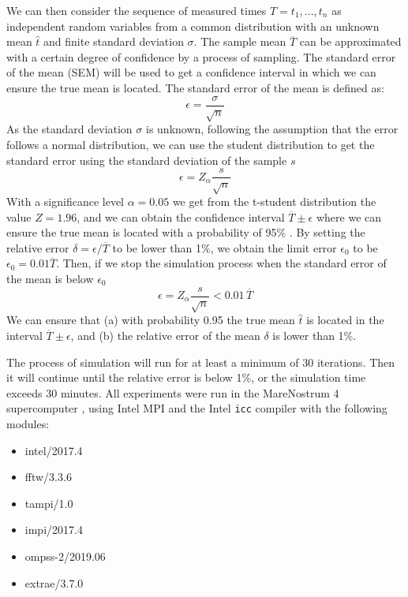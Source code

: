 We can then consider the sequence of measured times $T = t_1,\ldots,t_n$ as 
independent random variables from a common distribution with an unknown mean 
$\hat t$ and finite standard deviation $\sigma$. The sample mean $\overline T$ 
can be approximated with a certain degree of confidence by a process of 
sampling. The standard error of the mean (SEM) will be used to get a confidence 
interval in which we can ensure the true mean is located. The standard error of 
the mean is defined as:
%
\begin{equation}
\epsilon = \frac{\sigma}{\sqrt{n}}
\end{equation}
%
As the standard deviation $\sigma$ is unknown, following the assumption that the 
error follows a normal distribution, we can use the student distribution to get 
the standard error using the standard deviation of the sample $s$
%
\begin{equation}
\epsilon = Z_\alpha\frac{s}{\sqrt{n}}
\end{equation}
%
With a significance level $\alpha=0.05$ we get from the t-student distribution 
the value $Z=1.96$, and we can obtain the confidence interval $\overline T \pm 
\epsilon$ where we can ensure the true mean is located with a probability of 
95\% \cite{ross}. By setting the relative error $\delta = \epsilon / \overline 
T$ to be lower than 1\%, we obtain the limit error $\epsilon_0$ to be 
$\epsilon_0 = 
0.01 \overline T$.
%
Then, if we stop the simulation process when the standard error of the mean is 
below $\epsilon_0$
%
\begin{equation}
\epsilon = Z_\alpha\frac{s}{\sqrt{n}} < 0.01 \, \overline T
\end{equation}
%
We can ensure that (a) with probability 0.95 the true mean $\hat t$ is located 
in the interval $\overline T \pm \epsilon$, and (b) the relative error of the 
mean $\delta$ is lower than 1\%.

The process of simulation will run for at least a minimum of 30 iterations. Then 
it will continue until the relative error is below 1\%, or the simulation time 
exceeds 30 minutes.
%
All experiments were run in the MareNostrum 4 supercomputer \cite{mn4}, using 
Intel MPI and the Intel \texttt{icc} compiler with the following modules:
\begin{multicols}{3}
\begin{itemize}
\item intel/2017.4
\item fftw/3.3.6
\item tampi/1.0
\item impi/2017.4
\item ompss-2/2019.06
\item extrae/3.7.0
\end{itemize}
\end{multicols}

